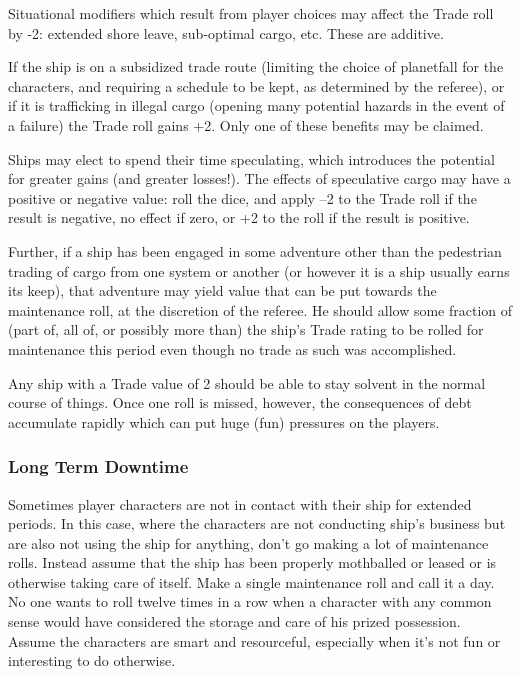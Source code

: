 Situational modifiers which result from player choices may affect the Trade roll by -2: extended shore leave, sub-optimal cargo, etc. These are additive.

If the ship is on a subsidized trade route (limiting the choice of planetfall for the characters, and requiring a schedule to be kept, as determined by the referee), or if it is trafficking in illegal cargo (opening many potential hazards in the event of a failure) the Trade roll gains +2. Only one of these benefits may be claimed.

Ships may elect to spend their time speculating, which introduces the potential for greater gains (and greater losses!). The effects of speculative cargo may have a positive or negative value: roll the dice, and apply –2 to the Trade roll if the result is negative, no effect if zero, or +2 to the roll if the result is positive.

Further, if a ship has been engaged in some adventure other than the pedestrian trading of cargo from one system or another (or however it is a ship usually earns its keep), that adventure may yield value that can be put towards the maintenance roll, at the discretion of the referee. He should allow some fraction of (part of, all of, or possibly more than) the ship's Trade rating to be rolled for maintenance this period even though no trade as such was accomplished.

Any ship with a Trade value of 2 should be able to stay solvent in the normal course of things. Once one roll is missed, however, the consequences of debt accumulate rapidly which can put huge (fun) pressures on the players.

\subsubsection{Long Term Downtime}\label{sec:long-term-downtime}
Sometimes player characters are not in contact with their ship for extended periods. In this case, where the characters are not conducting ship's business but are also not using the ship for anything, don't go making a lot of maintenance rolls. Instead assume that the ship has been properly mothballed or leased or is otherwise taking care of itself. Make a single maintenance roll and call it a day. No one wants to roll twelve times in a row when a character with any common sense would have considered the storage and care of his prized possession. Assume the characters are smart and resourceful, especially when it's not fun or interesting to do otherwise.
